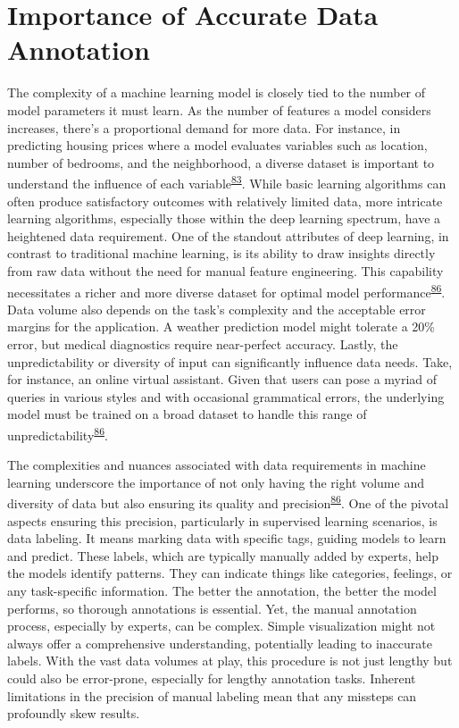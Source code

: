 \documentclass[
  10pt,
]{scrbook}
\begin{document}
\hypertarget{importance-of-accurate-data-annotation}{%
\section{Importance of Accurate Data
Annotation}\label{importance-of-accurate-data-annotation}}

The complexity of a machine learning model is closely tied to the number
of model parameters it must learn. As the number of features a model
considers increases, there's a proportional demand for more data. For
instance, in predicting housing prices where a model evaluates variables
such as location, number of bedrooms, and the neighborhood, a diverse
dataset is important to understand the influence of each
variable\textsuperscript{\protect\hyperlink{ref-hastie01statisticallearning}{83}}.
While basic learning algorithms can often produce satisfactory outcomes
with relatively limited data, more intricate learning algorithms,
especially those within the deep learning spectrum, have a heightened
data requirement. One of the standout attributes of deep learning, in
contrast to traditional machine learning, is its ability to draw
insights directly from raw data without the need for manual feature
engineering. This capability necessitates a richer and more diverse
dataset for optimal model
performance\textsuperscript{\protect\hyperlink{ref-Goodfellow-et-al-2016}{86}}.
Data volume also depends on the task's complexity and the acceptable
error margins for the application. A weather prediction model might
tolerate a 20\% error, but medical diagnostics require near-perfect
accuracy. Lastly, the unpredictability or diversity of input can
significantly influence data needs. Take, for instance, an online
virtual assistant. Given that users can pose a myriad of queries in
various styles and with occasional grammatical errors, the underlying
model must be trained on a broad dataset to handle this range of
unpredictability\textsuperscript{\protect\hyperlink{ref-Goodfellow-et-al-2016}{86}}.

The complexities and nuances associated with data requirements in
machine learning underscore the importance of not only having the right
volume and diversity of data but also ensuring its quality and
precision\textsuperscript{\protect\hyperlink{ref-Goodfellow-et-al-2016}{86}}.
One of the pivotal aspects ensuring this precision, particularly in
supervised learning scenarios, is data labeling. It means marking data
with specific tags, guiding models to learn and predict. These labels,
which are typically manually added by experts, help the models identify
patterns. They can indicate things like categories, feelings, or any
task-specific information. The better the annotation, the better the
model performs, so thorough annotations is essential. Yet, the manual
annotation process, especially by experts, can be complex. Simple
visualization might not always offer a comprehensive understanding,
potentially leading to inaccurate labels. With the vast data volumes at
play, this procedure is not just lengthy but could also be error-prone,
especially for lengthy annotation tasks. Inherent limitations in the
precision of manual labeling mean that any missteps can profoundly skew
results.
\end{document}
